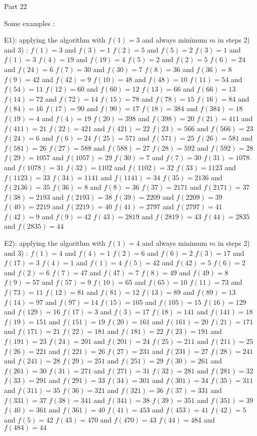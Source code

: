 \begin{solution}
	Part 2\/2

Some examples :

E1): applying the algorithm with $f(1)=3$ and always minimum $m$ in steps 2) and 3) :
$f(1)=3$ and $f(3)=1$
$f(2)=5$ and $f(5)=2$
$f(3)=1$ and $f(1)=3$
$f(4)=19$ and $f(19)=4$
$f(5)=2$ and $f(2)=5$
$f(6)=24$ and $f(24)=6$
$f(7)=30$ and $f(30)=7$
$f(8)=36$ and $f(36)=8$
$f(9)=42$ and $f(42)=9$
$f(10)=48$ and $f(48)=10$
$f(11)=54$ and $f(54)=11$
$f(12)=60$ and $f(60)=12$
$f(13)=66$ and $f(66)=13$
$f(14)=72$ and $f(72)=14$
$f(15)=78$ and $f(78)=15$
$f(16)=84$ and $f(84)=16$
$f(17)=90$ and $f(90)=17$
$f(18)=384$ and $f(384)=18$
$f(19)=4$ and $f(4)=19$
$f(20)=398$ and $f(398)=20$
$f(21)=411$ and $f(411)=21$
$f(22)=421$ and $f(421)=22$
$f(23)=566$ and $f(566)=23$
$f(24)=6$ and $f(6)=24$
$f(25)=571$ and $f(571)=25$
$f(26)=581$ and $f(581)=26$
$f(27)=588$ and $f(588)=27$
$f(28)=592$ and $f(592)=28$
$f(29)=1057$ and $f(1057)=29$
$f(30)=7$ and $f(7)=30$
$f(31)=1078$ and $f(1078)=31$
$f(32)=1102$ and $f(1102)=32$
$f(33)=1123$ and $f(1123)=33$
$f(34)=1141$ and $f(1141)=34$
$f(35)=2136$ and $f(2136)=35$
$f(36)=8$ and $f(8)=36$
$f(37)=2171$ and $f(2171)=37$
$f(38)=2193$ and $f(2193)=38$
$f(39)=2209$ and $f(2209)=39$
$f(40)=2219$ and $f(2219)=40$
$f(41)=2797$ and $f(2797)=41$
$f(42)=9$ and $f(9)=42$
$f(43)=2819$ and $f(2819)=43$
$f(44)=2835$ and $f(2835)=44$

E2): applying the algorithm with $f(1)=4$ and always minimum $m$ in steps 2) and 3) :
$f(1)=4$ and $f(4)=1$
$f(2)=6$ and $f(6)=2$
$f(3)=17$ and $f(17)=3$
$f(4)=1$ and $f(1)=4$
$f(5)=42$ and $f(42)=5$
$f(6)=2$ and $f(2)=6$
$f(7)=47$ and $f(47)=7$
$f(8)=49$ and $f(49)=8$
$f(9)=57$ and $f(57)=9$
$f(10)=65$ and $f(65)=10$
$f(11)=73$ and $f(73)=11$
$f(12)=81$ and $f(81)=12$
$f(13)=89$ and $f(89)=13$
$f(14)=97$ and $f(97)=14$
$f(15)=105$ and $f(105)=15$
$f(16)=129$ and $f(129)=16$
$f(17)=3$ and $f(3)=17$
$f(18)=141$ and $f(141)=18$
$f(19)=151$ and $f(151)=19$
$f(20)=161$ and $f(161)=20$
$f(21)=171$ and $f(171)=21$
$f(22)=181$ and $f(181)=22$
$f(23)=191$ and $f(191)=23$
$f(24)=201$ and $f(201)=24$
$f(25)=211$ and $f(211)=25$
$f(26)=221$ and $f(221)=26$
$f(27)=231$ and $f(231)=27$
$f(28)=241$ and $f(241)=28$
$f(29)=251$ and $f(251)=29$
$f(30)=261$ and $f(261)=30$
$f(31)=271$ and $f(271)=31$
$f(32)=281$ and $f(281)=32$
$f(33)=291$ and $f(291)=33$
$f(34)=301$ and $f(301)=34$
$f(35)=311$ and $f(311)=35$
$f(36)=321$ and $f(321)=36$
$f(37)=331$ and $f(331)=37$
$f(38)=341$ and $f(341)=38$
$f(39)=351$ and $f(351)=39$
$f(40)=361$ and $f(361)=40$
$f(41)=453$ and $f(453)=41$
$f(42)=5$ and $f(5)=42$
$f(43)=470$ and $f(470)=43$
$f(44)=484$ and $f(484)=44$


\end{solution}
